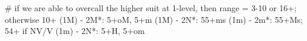 # if we are able to overcall the higher suit at 1-level, then range = 3-10 or 16+; otherwise 10+
(1M) - 2M*: 5+oM, 5+m 
(1M) - 2N*: 55+ms
(1m) - 2m*: 55+Ms; 54+ if NV/V 
(1m) - 2N*: 5+H, 5+om